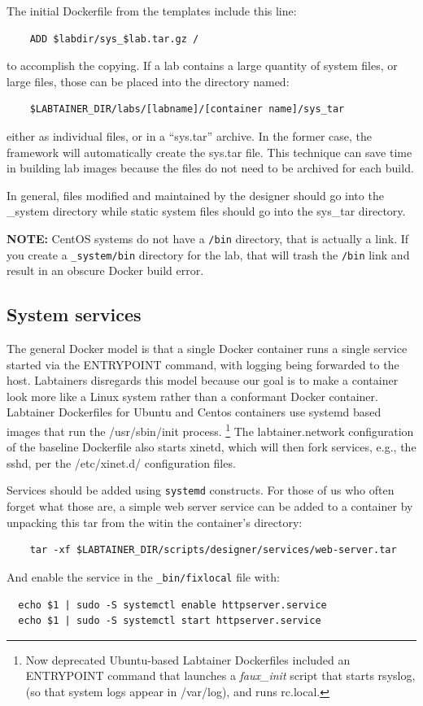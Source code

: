 \documentclass[12pt]{article}
\begin{document}
The initial Dockerfile from the templates include this line:
\begin{verbatim}
    ADD $labdir/sys_$lab.tar.gz /
\end{verbatim}
\noindent to accomplish the copying. 
If a lab contains a large quantity of system files, or large files, those
can be placed into the directory named:
\begin{verbatim}
    $LABTAINER_DIR/labs/[labname]/[container name]/sys_tar
\end{verbatim}
either as individual files, or in a ``sys.tar'' archive.  In the former case,
the framework will automatically create the sys.tar file.  This technique 
can save time in building lab images because the files do not need to be 
archived for each build.  

In general, files modified and maintained by the designer should go into the
\_system directory while static system files should go into the sys\_tar directory.

\textbf{NOTE:} CentOS systems do not have a {\tt /bin} directory, that is actually a link.  If you
create a {\tt \_system/bin} directory for the lab, that will trash the {\tt /bin} link and result in 
an obscure Docker build error.

\subsection {System services}
The general Docker 
model is that a single Docker container runs a single service started via the ENTRYPOINT command, with logging being forwarded to 
the host.  Labtainers disregards this model because our goal is to make a container look more like a Linux
system rather than a conformant Docker container.  Labtainer Dockerfiles for Ubuntu and Centos containers
use systemd based images that run the /usr/sbin/init process.  \footnote {Now deprecated Ubuntu-based Labtainer Dockerfiles included an
ENTRYPOINT command that launches a \textit{faux\_init} script that starts rsyslog, (so that system logs
appear in /var/log), and runs rc.local.}  The labtainer.network configuration of the baseline Dockerfile also starts xinetd,
which will then fork services, e.g., the sshd, per the /etc/xinet.d/ configuration files.  

Services should be added using {\tt systemd} constructs.  For those of us who often forget what those are, a simple web server
service can be added to a container by unpacking this tar from the witin the container's directory:
\begin{verbatim}
    tar -xf $LABTAINER_DIR/scripts/designer/services/web-server.tar
\end{verbatim} 
\noindent And enable the service in the {\tt \_bin/fixlocal} file with:
\begin{verbatim}
  echo $1 | sudo -S systemctl enable httpserver.service
  echo $1 | sudo -S systemctl start httpserver.service
\end{verbatim}
\end{document}
